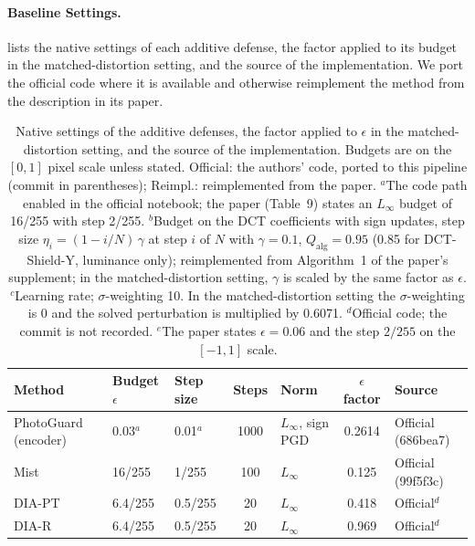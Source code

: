 \paragraph{Baseline Settings.}  lists the native settings of each additive defense, the factor applied to its budget in the matched-distortion setting, and the source of the implementation. We port the official code where it is available and otherwise reimplement the method from the description in its paper.

\begin{table}[t]
  \centering
  \footnotesize
  \setlength{\tabcolsep}{5pt}
  \caption{Native settings of the additive defenses, the factor applied to $\epsilon$ in the matched-distortion setting, and the source of the implementation. Budgets are on the $[0, 1]$ pixel scale unless stated. Official: the authors' code, ported to this pipeline (commit in parentheses); Reimpl.: reimplemented from the paper. $^{a}$The code path enabled in the official notebook; the paper (Table~9) states an $L_\infty$ budget of 16/255 with step 2/255. $^{b}$Budget on the DCT coefficients with sign updates, step size $\eta_i = (1 - i/N)\,\gamma$ at step $i$ of $N$ with $\gamma = 0.1$, $Q_{\mathrm{alg}} = 0.95$ (0.85 for DCT-Shield-Y, luminance only); reimplemented from Algorithm~1 of the paper's supplement; in the matched-distortion setting, $\gamma$ is scaled by the same factor as $\epsilon$. $^{c}$Learning rate; $\sigma$-weighting 10. In the matched-distortion setting the $\sigma$-weighting is 0 and the solved perturbation is multiplied by 0.6071. $^{d}$Official code; the commit is not recorded. $^{e}$The paper states $\epsilon = 0.06$ and the step $2/255$ on the $[-1, 1]$ scale.}
  \label{tab:supp_provenance}
  \begin{tabular}{@{}l l l c l c l@{}}
    \toprule
    Method & Budget $\epsilon$ & Step size & Steps & Norm & $\epsilon$ factor & Source \\
    \midrule
    PhotoGuard (encoder)~\cite{salman2023photoguard} & 0.03$^{a}$ & 0.01$^{a}$ & 1000 & $L_\infty$, sign PGD & 0.2614 & Official (686bea7) \\
    Mist~\cite{liang2023mist} & 16/255 & 1/255 & 100 & $L_\infty$ & 0.125 & Official (99f5f3c) \\
    DIA-PT~\cite{dia2025} & 6.4/255 & 0.5/255 & 20 & $L_\infty$ & 0.418 & Official$^{d}$ \\
    DIA-R~\cite{dia2025} & 6.4/255 & 0.5/255 & 20 & $L_\infty$ & 0.969 & Official$^{d}$ \\

\end{tabular}
\end{table}
